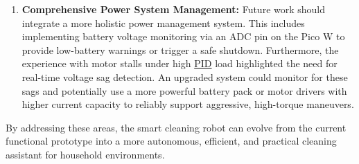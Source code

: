 \begin{enumerate}
\begin{itemize}
            \item \textbf{Add Mechanical Brushes}: Integrate a motorized roller brush to agitate dirt from carpets and hard floors, and side brushes to sweep debris from edges and corners into the vacuum's path.
        \end{itemize}
    \item \textbf{Comprehensive Power System Management:} Future work should integrate a more holistic power management system. This includes implementing battery voltage monitoring via an ADC pin on the Pico W to provide low-battery warnings or trigger a safe shutdown. Furthermore, the experience with motor stalls under high \hyperref[term:pid]{PID} load highlighted the need for real-time voltage sag detection. An upgraded system could monitor for these sags and potentially use a more powerful battery pack or motor drivers with higher current capacity to reliably support aggressive, high-torque maneuvers.
\end{enumerate}
By addressing these areas, the smart cleaning robot can evolve from the current functional prototype into a more autonomous, efficient, and practical cleaning assistant for household environments.